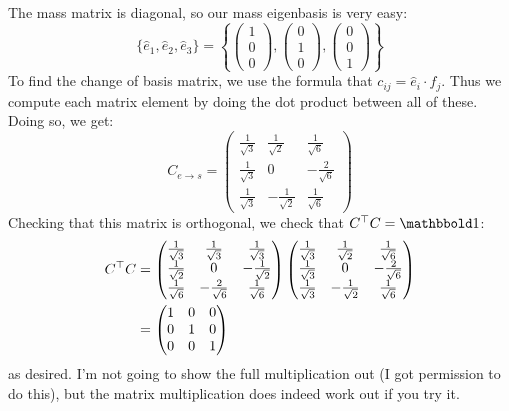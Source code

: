 \documentclass{article}
\begin{document}
\begin{solution}
	The mass matrix is diagonal, so our mass eigenbasis is very easy:
	\[
		\{\hat{e}_1, \hat{e}_2, \hat{e}_3\} = \left\{ \begin{pmatrix} 1\\0\\0 \end{pmatrix} , \begin{pmatrix} 0\\1\\0 \end{pmatrix} , \begin{pmatrix} 0\\0\\1 \end{pmatrix} \right\}
	\] 
	To find the change of basis matrix, we use the formula that $c_{ij} = \hat{e}_i \cdot \hat{f}_j$. Thus we 
	compute each matrix element by doing the dot product between all of these. Doing so, we get:
	\[
		C_{e \to s} = \begin{pmatrix} \frac{1}{\sqrt{3} }& \frac{1}{\sqrt{2} }& \frac{1}{\sqrt{6} }\\
		\frac{1}{\sqrt{3} } & 0 & -\frac{2}{\sqrt{6} }\\
	\frac{1}{\sqrt{3} } & -\frac{1}{\sqrt{2} } & \frac{1}{\sqrt{6} }\end{pmatrix} 
	\] 
	Checking that this matrix is orthogonal, we check that $C^\T C = \mathbbold 1$:
	\begin{align*}
		C^\top C &= \begin{pmatrix} \frac{1}{\sqrt{3} }& \frac{1}{\sqrt{3} }& \frac{1}{\sqrt{3} }\\ \frac{1}{\sqrt{2} } & 0 & -\frac{1}{\sqrt{2} }\\\frac{1}{\sqrt{6} } & -\frac{2}{\sqrt{6} } & \frac{1}{\sqrt{6} } \end{pmatrix} \begin{pmatrix} \frac{1}{\sqrt{3} }& \frac{1}{\sqrt{2} }& \frac{1}{\sqrt{6} }\\
		\frac{1}{\sqrt{3} } & 0 & -\frac{2}{\sqrt{6} }\\
	\frac{1}{\sqrt{3} } & -\frac{1}{\sqrt{2} } & \frac{1}{\sqrt{6} }\end{pmatrix} 
 \\
 &= \begin{pmatrix} 1 & 0 & 0 \\ 0 & 1 & 0\\0 & 0 & 1 \end{pmatrix}  
	\end{align*}
	as desired. I'm not going to show the full multiplication out (I got permission to do this), but the 
	matrix multiplication does indeed work out if you try it. 
\end{solution}
\end{document}
